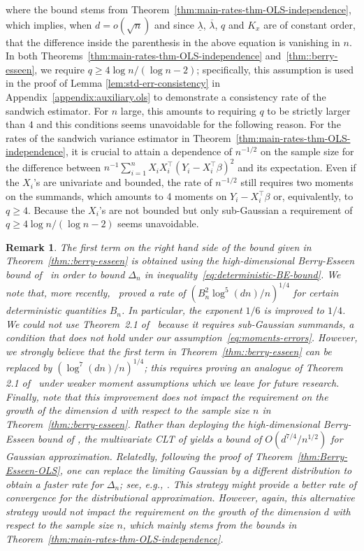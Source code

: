 \documentclass{article}
\newtheorem{remark}{Remark}
\begin{document}
where the bound stems from Theorem~\ref{thm:main-rates-thm-OLS-independence}, which
implies,
when $d = o(\sqrt{n})$ and since $\underline{\lambda}$, $\overline{\lambda}$, $q$ and $K_x$ are of constant order, that the difference inside the parenthesis in the above equation is vanishing in $n$.
In both Theorems~\ref{thm:main-rates-thm-OLS-independence} and~\ref{thm::berry-esseen}, we require $q \ge 4\log n/(\log n - 2)$; specifically, this assumption is used in the proof of Lemma \ref{lem:std-err-consistency} in Appendix~\ref{appendix:auxiliary.ols} to demonstrate a consistency rate of the sandwich estimator. For $n$ large, this amounts to requiring $q$ to be strictly larger than $4$ and this conditions seems unavoidable for the following reason. For the rates of the sandwich variance estimator in Theorem~\ref{thm:main-rates-thm-OLS-independence}, it is crucial to attain a dependence of $n^{-1/2}$ on the sample size for the difference between $n^{-1}\sum_{i=1}^n X_iX_i^{\top}(Y_i - X_i^{\top}\beta)^2$ and its expectation. Even if the $X_i$'s are univariate and bounded, the rate of $n^{-1/2}$ still requires two moments on the summands, which amounts to 4 moments on $Y_i - X_i^{\top}\beta$ or, equivalently, to $q \ge 4$. Because the $X_i$'s are not bounded but only sub-Gaussian a requirement of $q \ge 4\log n/(\log n - 2)$ seems unavoidable.
\begin{remark}
The first term on the right hand side of the bound given in Theorem~\ref{thm::berry-esseen} is obtained using the high-dimensional Berry-Esseen bound of~\cite{koike2019notes} in order to bound $\Delta_n$ in inequality~\eqref{eq:deterministic-BE-bound}.
We note that, more recently,~\citet{chernozhukov2019improved} proved a rate of $(B_n^2\log^5(dn)/n)^{1/4}$ for certain deterministic quantities
$B_n$.
In particular, the exponent $1/6$ is improved to $1/4$. We could not use Theorem~2.1 of~\cite{chernozhukov2019improved} because it requires sub-Gaussian summands, a condition that does not hold under our assumption~\ref{eq:moments-errors}. However, we strongly believe that the first term in Theorem~\ref{thm::berry-esseen} can be replaced by $(\log^7(dn)/n)^{1/4}$; this requires proving an analogue of Theorem 2.1 of~\cite{chernozhukov2019improved} under weaker moment assumptions which we leave for future research. Finally, note that this improvement does not impact the requirement on the growth of the dimension $d$ with respect to the sample size $n$ in Theorem~\ref{thm::berry-esseen}.
Rather than deploying the high-dimensional Berry-Esseen bound of \cite{koike2019notes}, the multivariate CLT of \cite{raivc2019multivariate} yields a bound of $O(d^{7/4}/n^{1/2})$ for Gaussian approximation. Relatedly, following the proof of Theorem~\ref{thm:Berry-Esseen-OLS}, one can replace the limiting Gaussian by a different distribution to obtain a faster rate for $\Delta_n$; see, e.g., \cite{zhilova2016non}. This strategy might provide a better rate of convergence for the distributional approximation. However, again, this alternative strategy would not impact the requirement on the growth of the dimension $d$ with respect to the sample size $n$, which mainly stems from the bounds in Theorem~\ref{thm:main-rates-thm-OLS-independence}.
\end{remark}
\end{document}
